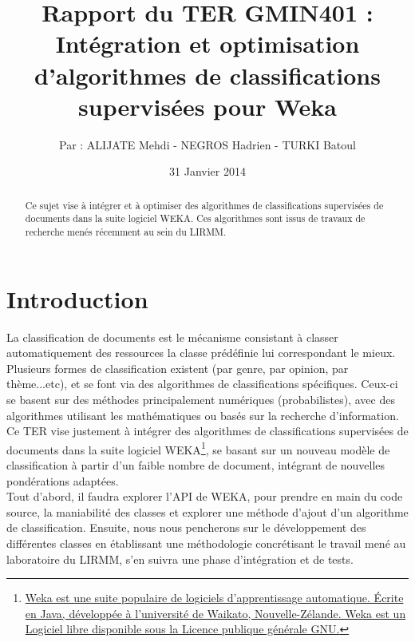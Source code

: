 \documentclass{article}
\title{Rapport du TER GMIN401 :\\ \textbf{Intégration et optimisation d’algorithmes de classifications supervisées pour Weka}}
\author{Par : ALIJATE Mehdi - NEGROS Hadrien - TURKI Batoul}
\date{31 Janvier 2014}
\begin{document}
\maketitle
\tableofcontents

\begin{abstract}
	
Ce sujet vise à intégrer et à optimiser des algorithmes de classifications supervisées de documents dans la suite logiciel WEKA. Ces algorithmes sont issus de travaux de recherche menés récemment au sein du LIRMM.
\end{abstract}

\newpage 
\section{Introduction}\label{sec:intro}

La classification de documents est le mécanisme consistant à classer automatiquement des ressources la classe prédéfinie lui correspondant le mieux.\\
Plusieurs formes de classification existent (par genre, par opinion, par thème...etc), et se font via des algorithmes de classifications spécifiques. Ceux-ci se basent sur des méthodes principalement numériques (probabilistes), avec des algorithmes utilisant les mathématiques ou basés sur la recherche d'information. \\
Ce TER vise justement à intégrer des algorithmes de classifications supervisées de documents dans la suite logiciel WEKA\footnote{\href{http://www.cs.waikato.ac.nz/~ml/weka/}{Weka est une suite populaire de logiciels d'apprentissage automatique. Écrite en Java, développée à l'université de Waikato, Nouvelle-Zélande. Weka est un Logiciel libre disponible sous la Licence publique générale GNU.}}, se basant sur un nouveau modèle de classification à partir d'un faible nombre de document, intégrant de nouvelles pondérations adaptées.\\
Tout d'abord, il faudra explorer l'API de WEKA, pour prendre en main du code source, la maniabilité des classes et explorer une méthode d'ajout d'un algorithme de classification. Ensuite, nous nous pencherons sur le développement des différentes classes en établissant une méthodologie concrétisant le travail mené au laboratoire du LIRMM, s'en suivra une phase d'intégration et de tests.\\

\end{document}
